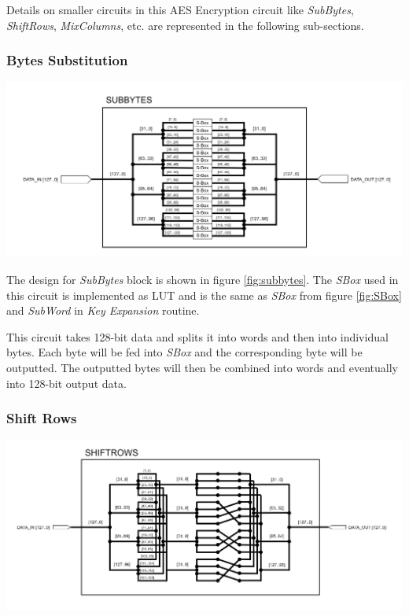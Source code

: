 \documentclass[a4paper, 10pt]{article}
\newenvironment{Figure}
    {\par\medskip\noindent\minipage{\linewidth}}
    {\endminipage\par\medskip}
\begin{document}
\begin{multicols}{2}
	Details on smaller circuits in this AES Encryption circuit like \textit{SubBytes}, \textit{ShiftRows}, \textit{MixColumns}, etc. are represented in the following sub-sections.

            \subsubsection{Bytes Substitution}

            \noindent
            \begin{Figure}
                \centering
                \includegraphics[width=\linewidth]{SubBytes.png}
                \label{fig:subbytes}
            \end{Figure}

            The design for \textit{SubBytes} block is shown in figure \ref{fig:subbytes}. The \textit{SBox} used in this circuit is implemented as LUT and is the same as \textit{SBox} from figure \ref{fig:SBox} and \textit{SubWord} in \textit{Key Expansion} routine.

            This circuit takes 128-bit data and splits it into words and then into individual bytes. Each byte will be fed into \textit{SBox} and the corresponding byte will be outputted. The outputted bytes will then be combined into words and eventually into 128-bit output data.

            \subsubsection{Shift Rows}

	\noindent
            \begin{Figure}
                \centering
                \includegraphics[width=\linewidth]{ShiftRows.png}
                \label{fig:shiftrows}
            \end{Figure}


\end{multicols}
\end{document}
